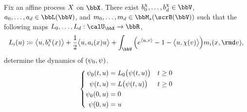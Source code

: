 \begin{theorem}
  \label{theorem:affine-regularity}
  Fix an affine process $X$ on $\stateSpace$.
  There exist $\affDriftPart^\trunc_0, \ldots, \affDriftPart^\trunc_d \in \vecSpace$, $\affDiffPart_0, \ldots, \affDiffPart_d \in \linSpace(\vecSpace)$, and $\affJumpPart_0, \ldots, \affJumpPart_d \in \signedMeasSpace{\scrB(\vecSpace)}$ such that the following maps $L_0,\ldots,L_d: \boundedSpace \rightarrow \bbR$,
  \begin{equation}
    \odePart_i(\momentVar)
    \defeq \bprj{\momentVar}{\affDriftPart_i^\trunc(\stateVar)} + \frac12\bprj{\momentVar}{\affDiffPart_i(\stateVar)\momentVar} + \int_\vecSpace \Big( e^\prj{\momentVar}{\markVar} - 1 - \bprj{\momentVar}{\trunc(\markVar)} \Big) \affJumpPart_i(\stateVar, \rmd\markVar),
  \end{equation}
  determine the dynamics of $(\psi_0, \psi)$.
  \begin{equation}
    \left\{\begin{aligned}
      \psi_0(t,u) &= L_0\big(\psi(t, u)\big) & t \geq 0 \\
      \psi(t,u) &= L\big(\psi(t,u)\big) & t \geq 0 \\
      \psi_0(0,u) &= 0 \\
      \psi(0, u) &= u
    \end{aligned}\right.
  \end{equation}
\end{theorem}
